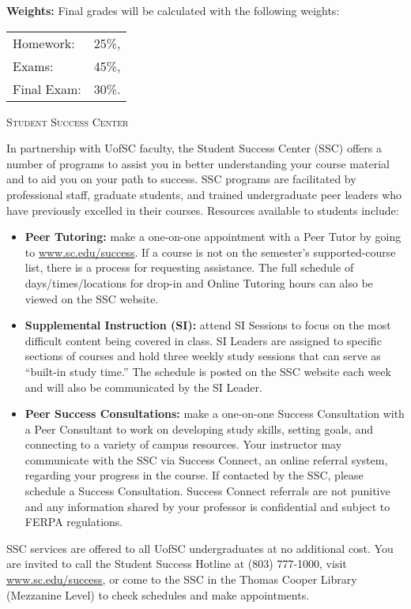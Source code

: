 \documentclass[teaching.portfolio.tex]{subfiles}
\begin{document}
\noindent
\textbf{Weights:} 
Final grades will be calculated with the following weights:
\begin{center}
  \begin{tabular}{lr}
    Homework: & 25\%,\\
    Exams: & 45\%,\\
    Final Exam: & 30\%.\\
  \end{tabular}
\end{center}

\begin{center}
  \textsc{Student Success Center}
\end{center}

\noindent
In partnership with UofSC faculty, the Student Success Center (SSC) offers a number of programs to assist you in better understanding your course material and to aid you on your path to success. 
SSC programs are facilitated by professional staff, graduate students, and trained undergraduate peer leaders who have previously excelled in their courses.
Resources available to students include: 
\begin{itemize}
\item 
  \textbf{Peer Tutoring:} make a one-on-one appointment with a Peer Tutor by going to \url{www.sc.edu/success}. 
  If a course is not on the semester’s supported-course list, there is a process for requesting assistance. 
  The full schedule of days/times/locations for drop-in and Online Tutoring hours can also be viewed on the SSC website.
\item
  \textbf{Supplemental Instruction (SI):} attend SI Sessions to focus on the most difficult content being covered in class. 
  SI Leaders are assigned to specific sections of courses and hold three weekly study sessions that can serve as “built-in study time.” 
  The schedule is posted on the SSC website each week and will also be communicated by the SI Leader.
\item
  \textbf{Peer Success Consultations:} make a one-on-one Success Consultation with a Peer Consultant to work on developing study skills, setting goals, and connecting to a variety of campus resources. 
  Your instructor may communicate with the SSC via Success Connect, an online referral system, regarding your progress in the course. 
  If contacted by the SSC, please schedule a Success Consultation. 
  Success Connect referrals are not punitive and any information shared by your professor is confidential and subject to FERPA regulations.
\end{itemize}
SSC services are offered to all UofSC undergraduates at no additional cost.
You are invited to call the Student Success Hotline at (803) 777-1000, visit \url{www.sc.edu/success}, or come to the SSC in the Thomas Cooper Library (Mezzanine Level) to check schedules and make appointments. 
\end{document}
